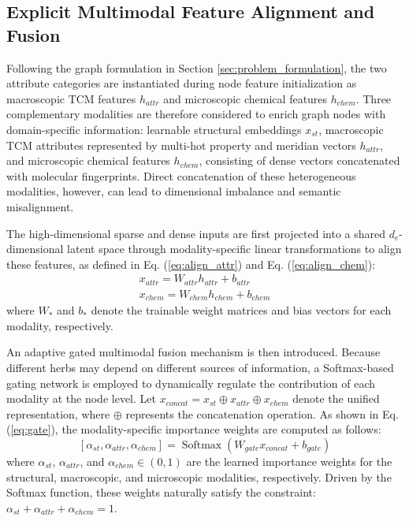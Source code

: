 \documentclass[a4paper,fleqn]{cas-dc}
\begin{document}
\subsection{Explicit Multimodal Feature Alignment and Fusion}

Following the graph formulation in Section \ref{sec:problem_formulation}, the two attribute categories are instantiated during node feature initialization as macroscopic TCM features $h_{attr}$ and microscopic chemical features $h_{chem}$. Three complementary modalities are therefore considered to enrich graph nodes with domain-specific information: learnable structural embeddings $x_{st}$, macroscopic TCM attributes represented by multi-\hspace{0pt}hot property and meridian vectors $h_{attr}$, and microscopic chemical features $h_{chem}$, consisting of dense vectors concatenated with molecular fingerprints. Direct concatenation of these heterogeneous modalities, however, can lead to dimensional imbalance and semantic misalignment.

The high-dimensional sparse and dense inputs are first projected into a shared $d_e$-dimensional latent space through modality-specific linear transformations to align these features, as defined in Eq. (\ref{eq:align_attr}) and Eq. (\ref{eq:align_chem}):
\begin{gather}
x_{attr} = W_{attr} h_{attr} + b_{attr}
\label{eq:align_attr} \\
x_{chem} = W_{chem} h_{chem} + b_{chem}
\label{eq:align_chem}
\end{gather}
where $W_*$ and $b_*$ denote the trainable weight matrices and bias vectors for each modality, respectively.

An adaptive gated multimodal fusion mechanism is then introduced. Because different herbs may depend on different sources of information, a Softmax-based gating network is employed to dynamically regulate the contribution of each modality at the node level. Let $x_{concat} = x_{st} \oplus x_{attr} \oplus x_{chem}$ denote the unified representation, where $\oplus$ represents the concatenation operation. As shown in Eq. (\ref{eq:gate}), the modality-specific importance weights are computed as follows:
\begin{equation}
\label{eq:gate}
[\alpha_{st}, \alpha_{attr}, \alpha_{chem}] = \operatorname{Softmax}(W_{gate} x_{concat} + b_{gate})
\end{equation}
where $\alpha_{st}$, $\alpha_{attr}$, and $\alpha_{chem} \in (0, 1)$ are the learned importance weights for the structural, macroscopic, and microscopic modalities, respectively. Driven by the Softmax function, these weights naturally satisfy the constraint: $\alpha_{st} + \alpha_{attr} + \alpha_{chem} = 1$.
\end{document}
